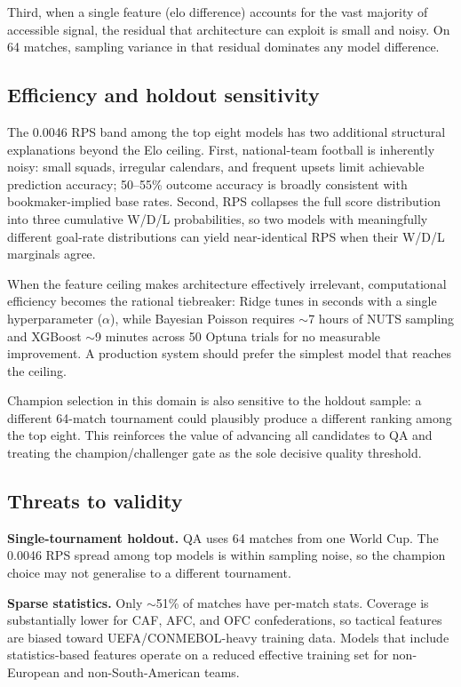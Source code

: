 \documentclass[conference]{IEEEtran}
\begin{document}
Third, when a single feature (elo difference) accounts for the vast majority 
of accessible signal, the residual that architecture can exploit is small and 
noisy. On 64 matches, sampling variance in that residual dominates any model 
difference. 

\subsection{Efficiency and holdout sensitivity}

The 0.0046 RPS band among the top eight models has two additional
structural explanations beyond the Elo ceiling.
First, national-team football is inherently noisy: small squads, irregular
calendars, and frequent upsets limit achievable prediction accuracy;
50--55\% outcome accuracy is broadly consistent with bookmaker-implied
base rates.
Second, RPS collapses the full score distribution into three cumulative
W/D/L probabilities, so two models with meaningfully different goal-rate
distributions can yield near-identical RPS when their W/D/L marginals
agree.

When the feature ceiling makes architecture effectively irrelevant,
computational efficiency becomes the rational tiebreaker:
Ridge tunes in seconds with a single hyperparameter ($\alpha$), while
Bayesian Poisson requires ${\sim}$7 hours of NUTS sampling and XGBoost
${\sim}$9 minutes across 50 Optuna trials for no measurable improvement.
A production system should prefer the simplest model that reaches the
ceiling.

Champion selection in this domain is also sensitive to the holdout sample:
a different 64-match tournament could plausibly produce a different ranking
among the top eight.
This reinforces the value of advancing all candidates to QA and treating
the champion/challenger gate as the sole decisive quality threshold.

\subsection{Threats to validity}
\label{sec:threats}

\textbf{Single-tournament holdout.}
QA uses 64 matches from one World Cup.
The 0.0046 RPS spread among top models is within sampling noise, so the
champion choice may not generalise to a different tournament.

\textbf{Sparse statistics.}
Only ${\sim}$51\% of matches have per-match stats.
Coverage is substantially lower for CAF, AFC, and OFC confederations, so
tactical features are biased toward UEFA/CONMEBOL-heavy training data.
Models that include statistics-based features operate on a reduced effective
training set for non-European and non-South-American teams.
\end{document}
